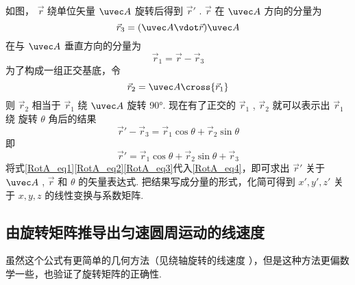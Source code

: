 如图， $\vec r$ 绕单位矢量 $\uvec A$ 旋转后得到 $\vec r'$ .  $\vec r$ 在 $\uvec A$ 方向的分量为   
\begin{equation}\label{RotA_eq1}
{\vec r_3} = (\uvec A \vdot \vec r)\uvec A
\end{equation}
 在与 $\uvec A$ 垂直方向的分量为
\begin{equation}\label{RotA_eq2}
{\vec r_1} = \vec r - {\vec r_3}
\end{equation}
 为了构成一组正交基底，令
 \begin{equation}\label{RotA_eq3}
{\vec r_2} = \uvec A \cross {\vec r_1}
\end{equation}
则 ${\vec r_2}$ 相当于 ${\vec r_1}$ 绕 $\uvec A$ 旋转 90°. 现在有了正交的 ${\vec r_1}$ , ${\vec r_2}$  就可以表示出 ${\vec r_1}$ 绕 旋转 $\theta $ 角后的结果
\begin{equation}
\vec r' - {\vec r_3} = {\vec r_1}\cos \theta  + {\vec r_2}\sin \theta
\end{equation}
即
\begin{equation}\label{RotA_eq4}
\vec r' = {\vec r_1}\cos \theta  + {\vec r_2}\sin \theta  + {\vec r_3}
\end{equation} 
将式\eqref{RotA_eq1}\eqref{RotA_eq2}\eqref{RotA_eq3}代入\eqref{RotA_eq4}，即可求出 $\vec r'$ 关于 $\uvec A$ , $\vec r$ 和 $\theta $ 的矢量表达式. 把结果写成分量的形式，化简可得到 $x',y',z'$ 关于 $x,y,z$ 的线性变换与系数矩阵.

\subsection{由旋转矩阵推导出匀速圆周运动的线速度} 

虽然这个公式有更简单的几何方法（见绕轴旋转的线速度%
），但是这种方法更偏数学一些，也验证了旋转矩阵的正确性.

